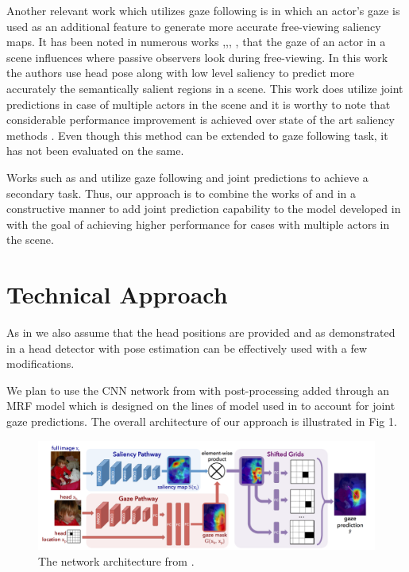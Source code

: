 \documentclass[10pt,twocolumn,letterpaper]{article}
\begin{document}
 Another relevant work which utilizes gaze following is \cite{parks2015augmented} in which an actor’s gaze is used as an additional feature to generate more accurate free-viewing saliency maps. It has been noted in numerous works \cite{parks2015augmented},\cite{marin2014detecting},\cite{flom2007gaze}, \cite{emery2000eyes}, \cite{newman2000real} that the gaze of an actor in a scene influences where passive observers look during free-viewing. In this work the authors use head pose \cite{newman2000real} along with low level saliency \cite{garcia2012saliency} to predict more accurately the semantically salient regions in a scene. This work does utilize joint predictions in case of multiple actors in the scene and it is worthy to note that considerable performance improvement is achieved over state of the art saliency methods \cite{garcia2012saliency}. Even though this method can be extended to gaze following task, it has not been evaluated on the same.

 Works such as \cite{fathi2012social} and \cite{parks2015augmented} utilize gaze following and joint predictions to achieve a secondary task. Thus, our approach is to combine the works of \cite{fathi2012social} and \cite{nips15_recasens} in a constructive manner to add joint prediction capability to the model developed in \cite{fathi2012social} with the goal of achieving higher performance for cases with multiple actors in the scene.

\section{Technical Approach}

As in \cite{nips15_recasens} we also assume that the head positions are provided and as demonstrated in \cite{parks2015augmented} a head detector with pose estimation can be effectively used with a few modifications.

We plan to use the CNN network from \cite{nips15_recasens} with post-processing added through an MRF model which is designed on the lines of model used in \cite{fathi2012social} to account for joint gaze predictions. The overall architecture of our approach is illustrated in Fig 1.

\begin{figure}[t]
  \begin{center}
    \includegraphics[width=0.95\linewidth]{images/cnn.png}
  \end{center}
  \vspace{-0.3cm}
   \caption{The network architecture from \cite{nips15_recasens}.}
  \vspace{-0.5cm}
\end{figure}
\end{document}
